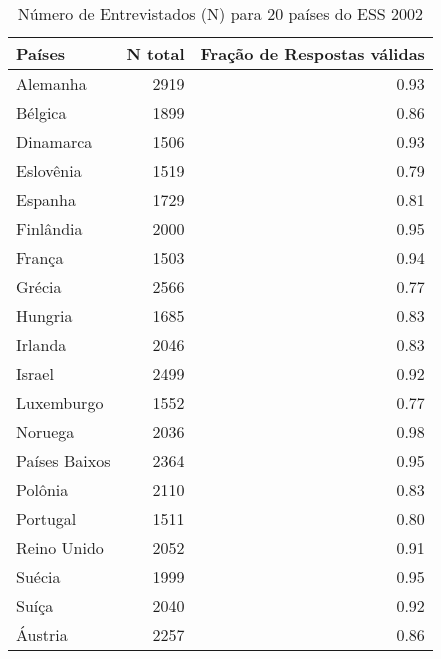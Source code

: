 \begin{table}[h]
  \centering
\label{my-label}
\begin{tabular}{|l|r|r|}
\hline
\textbf{Países} & \textbf{N total} & \textbf{Fração  de Respostas  válidas} \\ \hline
Alemanha        & 2919             & 0.93                           \\ \hline
Bélgica         & 1899             & 0.86                           \\ \hline
Dinamarca       & 1506             & 0.93                           \\ \hline
Eslovênia       & 1519             & 0.79                           \\ \hline
Espanha         & 1729             & 0.81                           \\ \hline
Finlândia       & 2000             & 0.95                           \\ \hline
França          & 1503             & 0.94                           \\ \hline
Grécia          & 2566             & 0.77                           \\ \hline
Hungria         & 1685             & 0.83                           \\ \hline
Irlanda         & 2046             & 0.83                           \\ \hline
Israel          & 2499             & 0.92                           \\ \hline
Luxemburgo      & 1552             & 0.77                           \\ \hline
Noruega         & 2036             & 0.98                           \\ \hline
Países Baixos   & 2364             & 0.95                           \\ \hline
Polônia         & 2110             & 0.83                           \\ \hline
Portugal        & 1511             & 0.80                           \\ \hline
Reino Unido     & 2052             & 0.91                           \\ \hline
Suécia          & 1999             & 0.95                           \\ \hline
Suíça           & 2040             & 0.92                           \\ \hline
Áustria         & 2257             & 0.86                           \\ \hline
\end{tabular}
\caption{Número de Entrevistados (N) para 20 países do ESS 2002}
\end{table}


